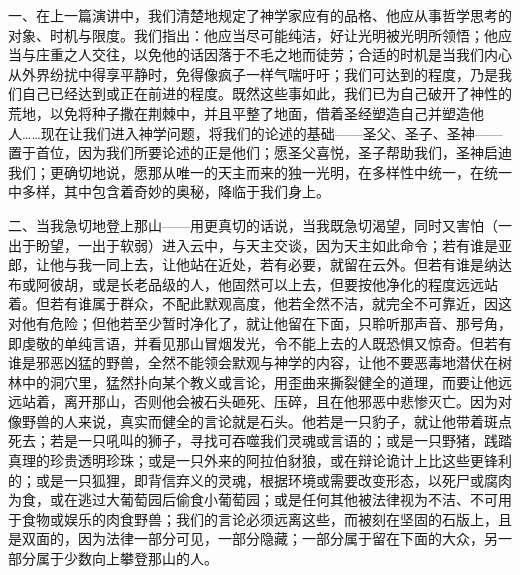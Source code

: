\par

一、在上一篇演讲中，我们清楚地规定了神学家应有的品格、他应从事哲学思考的对象、时机与限度。我们指出：他应当尽可能纯洁，好让光明被光明所领悟；他应当与庄重之人交往，以免他的话因落于不毛之地而徒劳；合适的时机是当我们内心从外界纷扰中得享平静时，免得像疯子一样气喘吁吁；我们可达到的程度，乃是我们自己已经达到或正在前进的程度。既然这些事如此，我们已为自己破开了神性的荒地，以免将种子撒在荆棘中，并且平整了地面，借着圣经塑造自己并塑造他人……现在让我们进入神学问题，将我们的论述的基础——圣父、圣子、圣神——置于首位，因为我们所要论述的正是他们；愿圣父喜悦，圣子帮助我们，圣神启迪我们；更确切地说，愿那从唯一的天主而来的独一光明，在多样性中统一，在统一中多样，其中包含着奇妙的奥秘，降临于我们身上。\par

二、当我急切地登上那山——用更真切的话说，当我既急切渴望，同时又害怕（一出于盼望，一出于软弱）进入云中，与天主交谈，因为天主如此命令；若有谁是亚郎，让他与我一同上去，让他站在近处，若有必要，就留在云外。但若有谁是纳达布或阿彼胡，或是长老品级的人，他固然可以上去，但要按他净化的程度远远站着。但若有谁属于群众，不配此默观高度，他若全然不洁，就完全不可靠近，因这对他有危险；但他若至少暂时净化了，就让他留在下面，只聆听那声音、那号角，即虔敬的单纯言语，并看见那山冒烟发光，令不能上去的人既恐惧又惊奇。但若有谁是邪恶凶猛的野兽，全然不能领会默观与神学的内容，让他不要恶毒地潜伏在树林中的洞穴里，猛然扑向某个教义或言论，用歪曲来撕裂健全的道理，而要让他远远站着，离开那山，否则他会被石头砸死、压碎，且在他邪恶中悲惨灭亡。因为对像野兽的人来说，真实而健全的言论就是石头。他若是一只豹子，就让他带着斑点死去；若是一只吼叫的狮子，寻找可吞噬我们灵魂或言语的；或是一只野猪，践踏真理的珍贵透明珍珠；或是一只外来的阿拉伯豺狼，或在辩论诡计上比这些更锋利的；或是一只狐狸，即背信弃义的灵魂，根据环境或需要改变形态，以死尸或腐肉为食，或在逃过大葡萄园后偷食小葡萄园；或是任何其他被法律视为不洁、不可用于食物或娱乐的肉食野兽；我们的言论必须远离这些，而被刻在坚固的石版上，且是双面的，因为法律一部分可见，一部分隐藏；一部分属于留在下面的大众，另一部分属于少数向上攀登那山的人。\par

